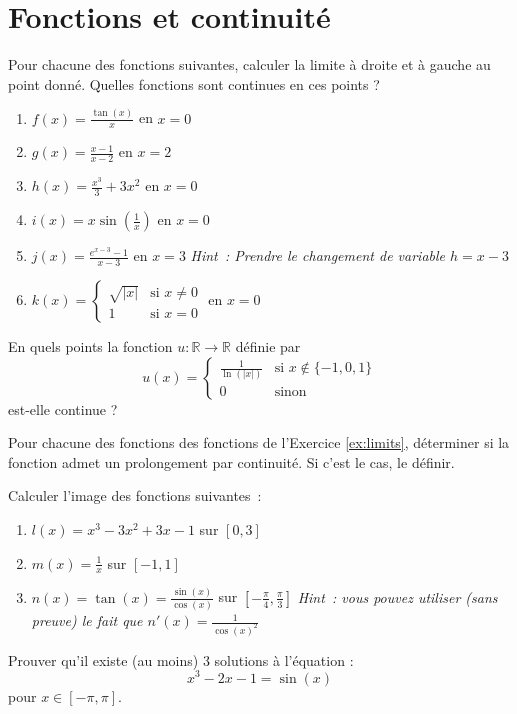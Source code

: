 \part{Fonctions et continuité}

\begin{exercice}\label{ex:limits}
Pour chacune des fonctions suivantes, calculer la limite à droite et à gauche au point donné. Quelles fonctions sont continues en ces points ?
\begin{enumerate}
    \item $f(x) = \frac{\tan(x)}{x}$ en $x = 0$
    \item $g(x) = \frac{x - 1}{x - 2}$ en $x = 2$
    \item $h(x) = \frac{x^3}{3} + 3x^2$ en $x = 0$
    \item $i(x) = x \sin\left(\frac{1}{x}\right)$ en $x = 0$
    \item $j(x) = \frac{e^{x - 3} - 1}{x - 3}$ en $x = 3$ \newline
    \emph{Hint~: Prendre le changement de variable $h = x-3$}
    
    \item $k(x) = \begin{cases}
    \sqrt{|x|} & \textrm{si } x \neq 0 \\
    1   & \textrm{si } x = 0
    \end{cases}$ en $x = 0$
\end{enumerate}
\end{exercice}

\begin{exercice}[Continuité]\label{ex:weird_function}
En quels points la fonction $u : \mathbb{R} \to \mathbb{R}$ définie par
\[
u(x) = \begin{cases}
\frac{1}{\ln(|x|)} & \textrm{si } x \not\in \{-1, 0, 1\} \\
0 & \textrm{sinon}
\end{cases}
\]
est-elle continue ?
\end{exercice}

\begin{exercice}
Pour chacune des fonctions des fonctions de l'Exercice \ref{ex:limits}, déterminer si la fonction admet un prolongement par continuité. Si c'est le cas, le définir.
\end{exercice}

\smallskip
\begin{exercice}
Calculer l'image des fonctions suivantes~:
\begin{enumerate}
    \item $l(x) = x^3 - 3x^2 + 3x - 1$ sur $[0, 3]$
    \item $m(x) = \frac{1}{x}$ sur $[-1, 1]$
    \item $n(x) = \tan(x) = \frac{\sin(x)}{\cos(x)}$ sur $[-\frac{\pi}{4}, \frac{\pi}{3}]$ \newline
    \emph{Hint~: vous pouvez utiliser (sans preuve) le fait que $n'(x) = \frac{1}{\cos(x)^2}$}
\end{enumerate}
\end{exercice}

\begin{exercice}\label{ex:equation_solutions}
Prouver qu'il existe (au moins) 3 solutions à l'équation :
\[
x^3 - 2x - 1 = \sin(x)
\]
pour $x \in [-\pi, \pi]$.
\end{exercice}